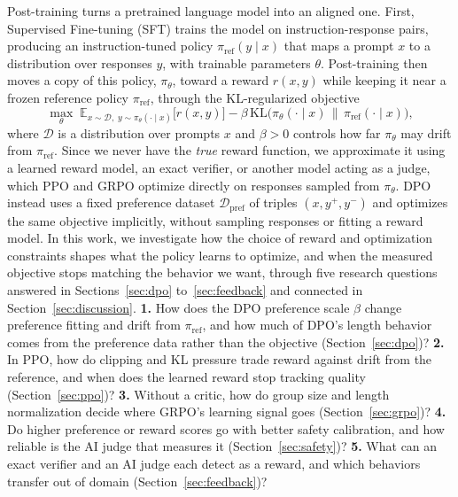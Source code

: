 \documentclass{article}
\begin{document}
Post-training turns a pretrained language model into an aligned one. First, Supervised Fine-tuning (SFT) trains the model on instruction-response pairs, producing an instruction-tuned policy $\pi_{\text{ref}}(y \mid x)$ that maps a prompt $x$ to a distribution over responses $y$, with trainable parameters $\theta$. Post-training then moves a copy of this policy, $\pi_\theta$, toward a reward $r(x, y)$ while keeping it near a frozen reference policy $\pi_{\text{ref}}$, through the KL-regularized objective
\begin{equation}
\label{eq:rlhf}
\max_\theta \; \mathbb{E}_{x \sim \mathcal D,\; y \sim \pi_\theta(\cdot\mid x)}\big[r(x, y)\big] - \beta\, \mathrm{KL}\big(\pi_\theta(\cdot \mid x) \,\|\, \pi_{\text{ref}}(\cdot \mid x)\big),
\end{equation}
where $\mathcal D$ is a distribution over prompts $x$ and $\beta > 0$ controls how far $\pi_\theta$ may drift from $\pi_{\text{ref}}$. Since we never have the \textit{true} reward function, we approximate it using a learned reward model, an exact verifier, or another model acting as a judge, which PPO and GRPO optimize directly on responses sampled from $\pi_\theta$. DPO instead uses a fixed preference dataset $\mathcal D_{\text{pref}}$ of triples $(x, y^+, y^-)$ and optimizes the same objective implicitly, without sampling responses or fitting a reward model. In this work, we investigate how the choice of reward and optimization constraints shapes what the policy learns to optimize, and when the measured objective stops matching the behavior we want, through five research questions answered in Sections~\ref{sec:dpo} to~\ref{sec:feedback} and connected in Section~\ref{sec:discussion}. \textbf{1.} How does the DPO preference scale $\beta$ change preference fitting and drift from $\pi_{\text{ref}}$, and how much of DPO's length behavior comes from the preference data rather than the objective (Section~\ref{sec:dpo})? \textbf{2.} In PPO, how do clipping and KL pressure trade reward against drift from the reference, and when does the learned reward stop tracking quality (Section~\ref{sec:ppo})? \textbf{3.} Without a critic, how do group size and length normalization decide where GRPO's learning signal goes (Section~\ref{sec:grpo})? \textbf{4.} Do higher preference or reward scores go with better safety calibration, and how reliable is the AI judge that measures it (Section~\ref{sec:safety})? \textbf{5.} What can an exact verifier and an AI judge each detect as a reward, and which behaviors transfer out of domain (Section~\ref{sec:feedback})?
\end{document}
